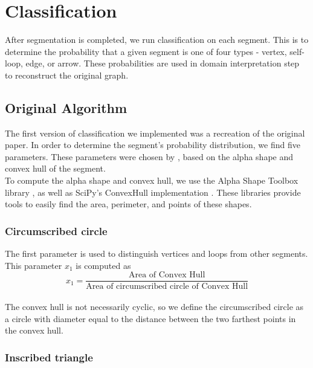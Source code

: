 \section{Classification}
\label{sec:classification}

After segmentation is completed, we run classification on each segment. This is to determine the probability that a given segment is one of four types - vertex, self-loop, edge, or arrow. These probabilities are used in domain interpretation step to reconstruct the original graph. 

\subsection{Original Algorithm}

The first version of classification we implemented was a recreation of the original paper. In order to determine the segment's probability distribution, we find five parameters. These parameters were chosen by \citeauthor{daly2015hand} \cite{daly2015hand}, based on the alpha shape and convex hull of the segment. \\ 

To compute the alpha shape and convex hull, we use the Alpha Shape Toolbox library \cite{alphashapetoolbox}, as well as SciPy's ConvexHull implementation \cite{scipy}. These libraries provide tools to easily find the area, perimeter, and points of these shapes. \\

\subsubsection{Circumscribed circle}

The first parameter is used to distinguish vertices and loops from other segments. This parameter $x_1$ is computed as \\

\begin{equation}
	x_1 = \frac{\text{Area of Convex Hull}}{\text{Area of circumscribed circle of Convex Hull}}
\end{equation} \\

The convex hull is not necessarily cyclic, so we define the circumscribed circle as a circle with diameter equal to the distance between the two farthest points in the convex hull. \\

\subsubsection{Inscribed triangle}

